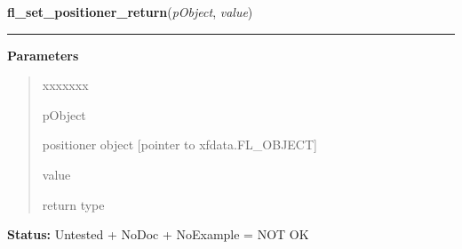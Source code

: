    \label{xformslib:library:fl_set_positioner_return}

    \vspace{0.5ex}

\hspace{.8\funcindent}\begin{boxedminipage}{\funcwidth}

    \raggedright \textbf{fl\_set\_positioner\_return}(\textit{pObject}, \textit{value})

    \vspace{-1.5ex}

    \rule{\textwidth}{0.5\fboxrule}
\setlength{\parskip}{2ex}
\setlength{\parskip}{1ex}
      \textbf{Parameters}
      \vspace{-1ex}

      \begin{quote}
        \begin{Ventry}{xxxxxxx}

          \item[pObject]

          positioner object [pointer to xfdata.FL\_OBJECT]

          \item[value]

          return type

        \end{Ventry}

      \end{quote}

\textbf{Status:} Untested + NoDoc + NoExample = NOT OK



    \end{boxedminipage}

    \label{xformslib:library:fl_add_scrollbar}

    \vspace{0.5ex}

